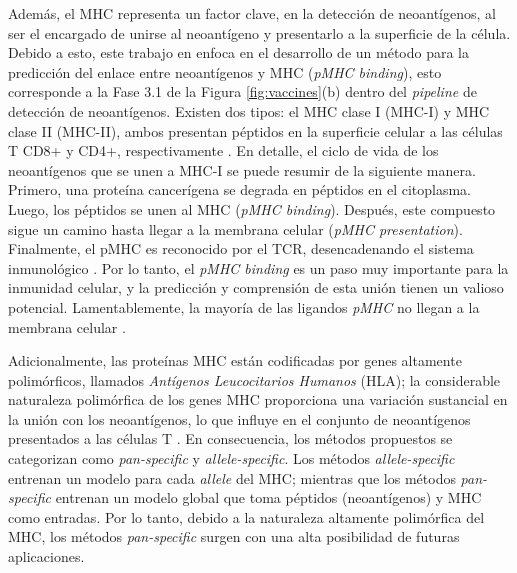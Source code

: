 Además, el MHC representa un factor clave, en la detección de neoantígenos, al ser el encargado de unirse al neoantígeno y presentarlo a la superficie de la célula. Debido a esto, este trabajo en enfoca en el desarrollo de un método para la predicción del enlace entre neoantígenos y MHC (\textit{pMHC binding}), esto corresponde a la Fase 3.1 de la Figura \ref{fig:vaccines}(b) dentro del \textit{pipeline} de detección de neoantígenos.  Existen dos tipos: el MHC clase I (MHC-I) y MHC clase II (MHC-II), ambos presentan péptidos en la superficie celular a las células T CD8+ y CD4+, respectivamente \citep{janeway1997immunobiology, abualrous2021major}. En detalle, el ciclo de vida de los neoantígenos que se unen a MHC-I se puede resumir de la siguiente manera. Primero, una proteína cancerígena se degrada en péptidos en el citoplasma. Luego, los péptidos se unen al MHC (\textit{pMHC binding}). Después, este compuesto sigue un camino hasta llegar a la membrana celular (\textit{pMHC presentation}). Finalmente, el pMHC es reconocido por el TCR, desencadenando el sistema inmunológico \citep{janeway1997immunobiology, wieczorek2017major, gasser2021interpreting}. Por lo tanto, el \textit{pMHC binding} es un paso muy importante para la inmunidad celular, y la predicción y comprensión de esta unión tienen un valioso potencial. Lamentablemente, la mayoría de las ligandos \textit{pMHC} no llegan a la membrana celular \citep{de2020neoantigen}. 

Adicionalmente, las proteínas MHC están codificadas por genes altamente polimórficos, llamados \textit{Antígenos Leucocitarios Humanos} (HLA); la considerable naturaleza polimórfica de los genes MHC proporciona una variación sustancial en la unión con los neoantígenos, lo que influye en el conjunto de neoantígenos presentados a las células T \citep{abualrous2021major}. En consecuencia, los métodos propuestos se categorizan como \textit{pan-specific} y \textit{allele-specific}. Los métodos \textit{allele-specific} \citep{rammensee1999syfpeithi, reche2002prediction, kim2009derivation, nielsen2016netmhcpan, vang2017hla, shao2020high, bravi2021rbm} entrenan un modelo para cada \textit{allele} del MHC; mientras que los métodos \textit{pan-specific} \citep{hu2019acme, liu2019deepseqpan, wu2019deephlapan, phloyphisut2019mhcseqnet, o2018mhcflurry, o2020mhcflurry, reynisson2020netmhcpan, venkatesh2020mhcattnnet, ye2021mathla, mei2021anthem, chu2022transformer, zhang2022hlab, mei2021anthem, hu2019acme, gfeller2023improved} entrenan un modelo global que toma péptidos (neoantígenos) y MHC como entradas. Por lo tanto, debido a la naturaleza altamente polimórfica del MHC, los métodos \textit{pan-specific} surgen con una alta posibilidad de futuras aplicaciones.

